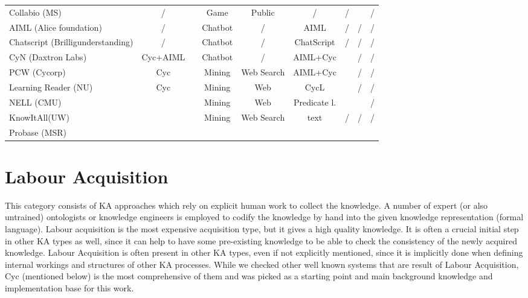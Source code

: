 \begin{landscape}
\begin{table}[htb]
\begin{tabular}{lclcccccc}
		Collabio (MS) & /  & \parencite{Bernstein2010}  & Game & Public  & /  & /  & \checkmark  & /  \\
		AIML (Alice foundation) & /  & \parencite{Wallace2003}  & Chatbot & /  & AIML  & /  & /  & /  \\
		Chatscript (Brilligunderstanding) & /  & \parencite{Wilcox2011}  & Chatbot & /  & ChatScript  & /  & /  & /  \\
		CyN (Daxtron Labs) & Cyc+AIML  & \parencite{Wilcox2011}  & Chatbot & /  & AIML+Cyc  & \checkmark  & /  & /  \\
	    PCW (Cycorp) & Cyc  & \parencite{Matuszek2004}  & Mining & Web Search  & AIML+Cyc  & \checkmark  & /  & /  \\
 		Learning Reader (NU) & Cyc & \parencite{Forbus2007} & Mining & Web & CycL & \checkmark & / & / \\
		NELL (CMU) & \ & \parencite{Mitchell2015} & Mining & Web & Predicate l. & \checkmark & \checkmark & / \\ 
		KnowItAll(UW) & \ & \parencite{Etzioni2004} & Mining & Web Search & text & / & / & / \\
		Probase (MSR) & \ & \parencite{Wu2012} & \\
		\hline
	\end{tabular}
\end{table}
\end{landscape}

\section{Labour Acquisition}
\label{section:LabourAcquisition}
This category consists of KA approaches which rely on explicit human work to 
collect the knowledge. A number of expert (or also untrained) ontologists or 
knowledge engineers is employed to codify the knowledge by hand into the given 
knowledge representation (formal language). Labour acquisition is the most 
expensive acquisition type, but it gives a high quality knowledge. It is often a
crucial initial step in other KA types as well, since it can help to have some 
pre-existing knowledge to be able to check the consistency of the newly acquired
knowledge. Labour Acquisition is often present in other KA types, even if not 
explicitly mentioned, since it is implicitly done when defining internal 
workings and structures of other KA processes. While we checked other well 
known systems that are result of Labour Acquisition, Cyc (mentioned below) is 
the most comprehensive of them and was picked as a starting point and main 
background knowledge and implementation base for this work.

